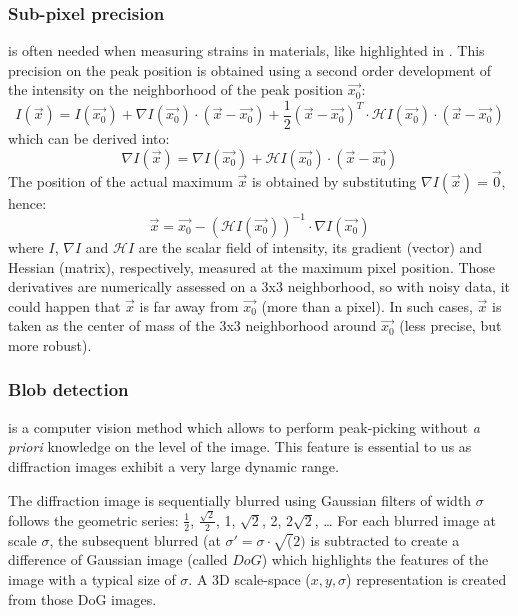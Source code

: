 \documentclass[preprint]{iucr}
\begin{document}
\subsubsection{Sub-pixel precision} 
\label{subpixel}
is often needed when measuring strains in materials, like highlighted in 
\cite{to5079}.
This precision on the peak position is obtained using a second order
development of the intensity on the neighborhood of the peak position $\overrightarrow{x_0}$:
$$ I(\overrightarrow{x}) = I(\overrightarrow{x_0}) + \nabla
I(\overrightarrow{x_0})\cdot (\overrightarrow{x}-\overrightarrow{x_0}) +
\frac{1}{2} (\overrightarrow{x}-\overrightarrow{x_0})^T\cdot\mathcal{H}
I(\overrightarrow{x_0})\cdot(\overrightarrow{x}-\overrightarrow{x_0})$$ which
can be derived into:
$$\nabla I(\overrightarrow{x}) =\nabla I(\overrightarrow{x_0}) +
\mathcal{H}I(\overrightarrow{x_0})\cdot(\overrightarrow{x}-\overrightarrow{x_0})$$
The position of the actual maximum $\overrightarrow{x}$ is obtained by substituting
$\nabla I(\overrightarrow{x})=\overrightarrow{0}$, hence:
$$\overrightarrow{x} = \overrightarrow{x_0} - (\mathcal{H}
I(\overrightarrow{x_0}))^{-1}\cdot\nabla I(\overrightarrow{x_0})$$ where $I$,
$\nabla I$ and $\mathcal{H} I$ are the scalar field of intensity, its gradient
(vector) and Hessian (matrix), respectively, measured at the maximum pixel position.
Those derivatives are numerically assessed on a 3x3 neighborhood, so with noisy
data, it could happen that $\overrightarrow{x}$ is far away from
$\overrightarrow{x_0}$ (more than a pixel). In such cases, $\overrightarrow{x}$
is taken as the center of mass of the 3x3 neighborhood around
$\overrightarrow{x_0}$ (less precise, but more robust).

\subsubsection{Blob detection}
\label{blob}
is a computer vision method which allows to perform peak-picking without
\textit{a priori} knowledge on the level of the image.
This feature is essential to us as diffraction images exhibit a very large
dynamic range.

The diffraction image is sequentially blurred using Gaussian filters of
width $\sigma$ follows the geometric series: $\frac{1}{2}$,
$\frac{\sqrt{2}}{2}$, 1, $\sqrt{2}$, 2, $2\sqrt{2}$, \ldots
For each blurred image at scale $\sigma$, the subsequent blurred (at
$\sigma'=\sigma\cdot\sqrt(2)$
is subtracted to create a difference of Gaussian
image (called $DoG$) which highlights the features of the image with a typical
size of $\sigma$.
A 3D scale-space ($x,y,\sigma$) representation is created from those DoG images.
\end{document}
